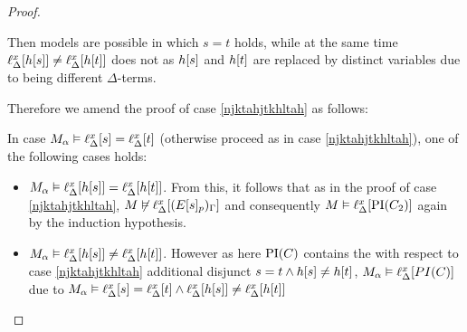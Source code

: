 \begin{proof}
\begin{indproof}
\begin{enumerate}
					Then models are possible in which $s=t$ holds, while at the same time $\ell_{\Delta}^{x}[h[s]] \neq \ell_{\Delta}^{x}[h[t]]$ does not as $h[s]$ and $h[t]$ are replaced by distinct variables due to being different $\Delta$-terms.

					Therefore we amend the proof of case \ref{njktahjtkhltah} as follows:

					In case $M_\alpha \vDash \ell_{\Delta}^{x}[s] = \ell_{\Delta}^{x}[t]$ (otherwise proceed as in case \ref{njktahjtkhltah}), 
					one of the following cases holds:

					\begin{itemize}
					\item $M_\alpha\vDash \ell_{\Delta}^{x}[h[s]] = \ell_{\Delta}^{x}[h[t]]$. From this, it follows that as in the proof of case \ref{njktahjtkhltah}, $M \not\vDash \ell_{\Delta}^{x}[(E{[s]_{p}})_\Gamma]$ and consequently $M \vDash \ell_{\Delta}^{x}[\operatorname{PI}(C_2)]$ again by the induction hypothesis.

					\item 
						$M_\alpha \vDash \ell_{\Delta}^{x}[h[s]] \neq \ell_{\Delta}^{x}[h[t]]$.
						However as here $\operatorname{PI}(C)$ contains the with respect to case \ref{njktahjtkhltah} additional disjunct $s=t \land h[s] \neq h[t]$,
						$M_\alpha \vDash \ell_{\Delta}^{x}[PI(C)]$ due to $M_\alpha \vDash \ell_{\Delta}^{x}[s]=\ell_{\Delta}^{x}[t] \land \ell_{\Delta}^{x}[h[s]] \neq \ell_{\Delta}^{x}[h[t]]$
					\qedhere
					\end{itemize}
			\end{enumerate}

	\end{indproof}
\end{proof}

